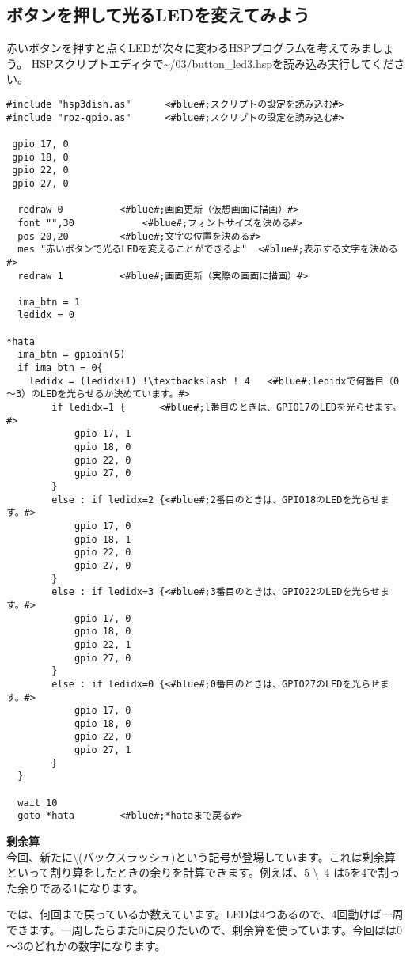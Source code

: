 \subsection{ボタンを押して光るLEDを変えてみよう}
赤いボタンを押すと点くLEDが次々に変わるHSPプログラムを考えてみましょう。
HSPスクリプトエディタで\textasciitilde /03/button\_led3.hspを読み込み実行してください。

\begin{lstlisting}[escapechar=!,caption=button\_led3.hsp,label=button_led3.hsp]
#include "hsp3dish.as"		<#blue#;スクリプトの設定を読み込む#>
#include "rpz-gpio.as"		<#blue#;スクリプトの設定を読み込む#>

 gpio 17, 0
 gpio 18, 0
 gpio 22, 0
 gpio 27, 0
	
  redraw 0			<#blue#;画面更新（仮想画面に描画）#>
  font "",30			<#blue#;フォントサイズを決める#>
  pos 20,20			<#blue#;文字の位置を決める#>
  mes "赤いボタンで光るLEDを変えることができるよ"	<#blue#;表示する文字を決める#>
  redraw 1			<#blue#;画面更新（実際の画面に描画）#>

  ima_btn = 1
  ledidx = 0

*hata
  ima_btn = gpioin(5)
  if ima_btn = 0{
    ledidx = (ledidx+1) !\textbackslash ! 4	  <#blue#;ledidxで何番目（0～3）のLEDを光らせるか決めています。#>
		if ledidx=1 {      <#blue#;l番目のときは、GPIO17のLEDを光らせます。#>
			gpio 17, 1
			gpio 18, 0
			gpio 22, 0
			gpio 27, 0
		}
		else : if ledidx=2 {<#blue#;2番目のときは、GPIO18のLEDを光らせます。#>
			gpio 17, 0
			gpio 18, 1
			gpio 22, 0
			gpio 27, 0
		}
		else : if ledidx=3 {<#blue#;3番目のときは、GPIO22のLEDを光らせます。#>
			gpio 17, 0
			gpio 18, 0
			gpio 22, 1
			gpio 27, 0
		}
		else : if ledidx=0 {<#blue#;0番目のときは、GPIO27のLEDを光らせます。#>
			gpio 17, 0
			gpio 18, 0
			gpio 22, 0
			gpio 27, 1
		}
  }

  wait 10
  goto *hata		<#blue#;*hataまで戻る#>
\end{lstlisting}

\textbf{剰余算}\\
今回、新たに\textbackslash (バックスラッシュ)という記号が登場しています。これは剰余算といって割り算をしたときの余りを計算できます。例えば、5 \textbackslash \ 4 は5を4で割った余りである1になります。

では、何回まで戻っているか数えています。LEDは4つあるので、4回動けば一周できます。一周したらまた0に戻りたいので、剰余算を使っています。今回はは0～3のどれかの数字になります。\\

